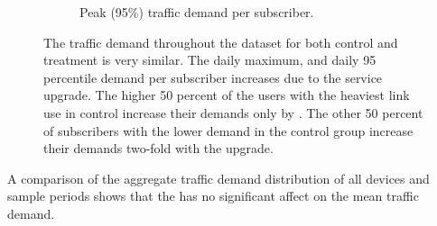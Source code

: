 \begin{figure}[t]
\begin{minipage}{1\linewidth}
\begin{subfigure}[b]{0.33\linewidth}
               \caption{Peak (95\%)
traffic demand per subscriber.\label{fig:CDF-data-rate-perc95}}
\end{subfigure}
%
\end{minipage}
\caption{The traffic demand throughout the dataset for both control and 
treatment is very similar. The daily maximum, and daily 95 percentile 
demand per subscriber increases due to the service upgrade. The 
higher 50 percent of the users with the heaviest link use in control increase 
their demands only by . The other 50 percent of subscribers with the 
lower demand in the control group increase their demands two-fold with the 
upgrade.}
\label{fig:traffic-demand-cdf}
\end{figure}


A comparison of the aggregate traffic demand distribution of all devices 
and sample periods shows that the \treatment{} has no significant affect on the 
mean traffic demand. 

